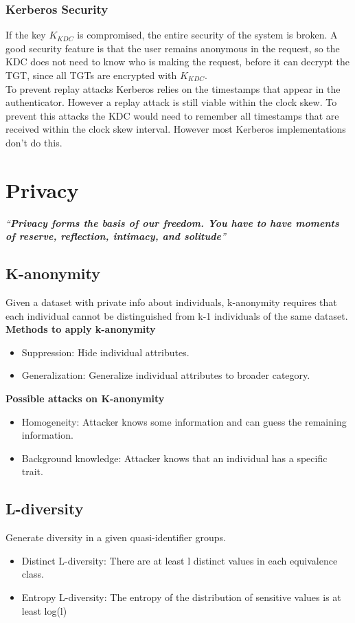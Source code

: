 \documentclass[a4paper]{article}
\begin{document}
\subsubsection{Kerberos Security}
If the key $K_{KDC}$ is compromised, the entire security of the system is broken. A good security feature is that the user remains anonymous in the request, so the KDC does not need to know who is making the request, before it can decrypt the TGT, since all TGTs are encrypted with $K_{KDC}$.\\
To prevent replay attacks Kerberos relies on the timestamps that appear in the authenticator. However a replay attack is still viable within the clock skew. To prevent this attacks the KDC would need to remember all timestamps that are received within the clock skew interval. However most Kerberos implementations don't do this.

\newpage
\section{Privacy}
\textit{``\textbf{Privacy forms the basis of our freedom. You have to have moments of reserve, reflection, intimacy, and solitude}''}

\subsection{K-anonymity}
Given a dataset with private info about individuals, k-anonymity requires that each individual cannot be distinguished from k-1 individuals of the same dataset.\\
\textbf{Methods to apply k-anonymity}
\begin{itemize}
    \item Suppression: Hide individual attributes.
    \item Generalization: Generalize individual attributes to broader category.
\end{itemize}{}
\textbf{Possible attacks on K-anonymity}
\begin{itemize}
    \item Homogeneity: Attacker knows some information and can guess the remaining information.
    \item Background knowledge: Attacker knows that an individual has a specific trait.
\end{itemize}{}

\subsection{L-diversity}
Generate diversity in a given quasi-identifier groups.
\begin{itemize}
    \item Distinct L-diversity: There are at least l distinct values in each equivalence class.
    \item Entropy L-diversity: The entropy of the distribution of sensitive values is at least log(l)
\end{itemize}
\end{document}
